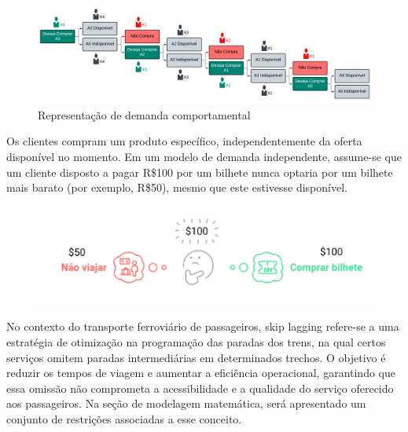 \begin{description}[style=unboxed, leftmargin=0cm]
        \begin{figure}[H]
            \begin{center}
                \includegraphics[scale=0.09]{img/dc1.png}
                \caption{Representação de demanda comportamental}
                \label{fig: dc1}
            \end{center}
        \end{figure}

    \item[Demanda independente:] Os clientes compram um produto específico, independentemente da oferta disponível no momento. Em um modelo de demanda independente, assume-se que um cliente disposto a pagar R\$100 por um bilhete nunca optaria por um bilhete mais barato (por exemplo, R\$50), mesmo que este estivesse disponível.
    
        \begin{figure}[H]
            \begin{center}
                \includegraphics[scale=0.7]{img/di1.png}
                \label{fig: di1}
            \end{center}
        \end{figure}
        \vspace{-1cm}
        
    \item[Skip lagging:] No contexto do transporte ferroviário de passageiros, skip lagging refere-se a uma estratégia de otimização na programação das paradas dos trens, na qual certos serviços omitem paradas intermediárias em determinados trechos. O objetivo é reduzir os tempos de viagem e aumentar a eficiência operacional, garantindo que essa omissão não comprometa a acessibilidade e a qualidade do serviço oferecido aos passageiros. Na seção de modelagem matemática, será apresentado um conjunto de restrições associadas a esse conceito.
    

\end{description}
